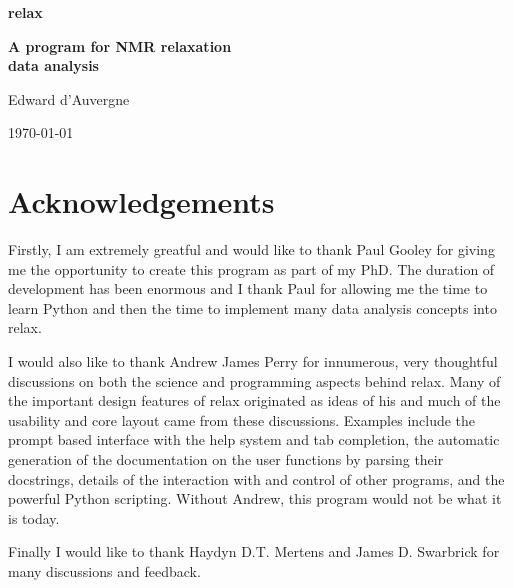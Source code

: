 \documentclass[a4paper, 11pt, twoside, openright]{book}
\begin{document}
\frontmatter



\begin{titlepage}
\begin{center}


{\Huge \textbf{relax}}

{\huge \textbf{A program for NMR relaxation\\data analysis}}

{\Large Edward d'Auvergne}

{\large \today}

\end{center}
\end{titlepage}



\chapter*{Acknowledgements}

Firstly, I am extremely greatful and would like to thank Paul Gooley for giving me the opportunity to create this program as part of my PhD.  The duration of development has been enormous and I thank Paul for allowing me the time to learn Python and then the time to implement many data analysis concepts into relax.

I would also like to thank Andrew James Perry for innumerous, very thoughtful discussions on both the science and programming aspects behind relax.  Many of the important design features of relax originated as ideas of his and much of the usability and core layout came from these discussions.  Examples include the prompt based interface with the help system and tab completion, the automatic generation of the documentation on the user functions by parsing their docstrings, details of the interaction with and control of other programs, and the powerful Python scripting.  Without Andrew, this program would not be what it is today.

Finally I would like to thank Haydyn D.T. Mertens and James D. Swarbrick for many discussions and feedback.
\end{document}

